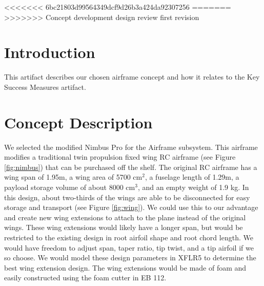 \documentclass[]{auvsi_doc}
\begin{document}
\begin{AUVSITitlePage}
\begin{artifacttable}
<<<<<<< 6bc21803d99564349dcf9d26b3a424da92307256
=======
>>>>>>> Concept development design review first revision
\end{artifacttable}
\end{AUVSITitlePage}

\section{Introduction}

This artifact describes our chosen airframe concept and how it relates to the Key Success Measures artifact.

\section{Concept Description}

We selected the modified Nimbus Pro for the Airframe subsystem. This airframe modifies a traditional twin propulsion fixed wing RC airframe (see Figure \ref{fig:nimbus}) that can be purchased off the shelf. The original RC airframe has a wing span of 1.95m, a wing area of 5700 cm$^2$, a fuselage length of 1.29m, a payload storage volume of about 8000 cm$^3$, and an empty weight of 1.9 kg. In this design, about two-thirds of the wings are able to be disconnected for easy storage and transport (see Figure \ref{fig:wing}). We could use this to our advantage and create new wing extensions to attach to the plane instead of the original wings. These wing extensions would likely have a longer span, but would be restricted to the existing design in root airfoil shape and root chord length. We would have freedom to adjust span, taper ratio, tip twist, and a tip airfoil if we so choose. We would model these design parameters in XFLR5 to determine the best wing extension design. The wing extensions would be made of foam and easily constructed using the foam cutter in EB 112.
\end{document}
